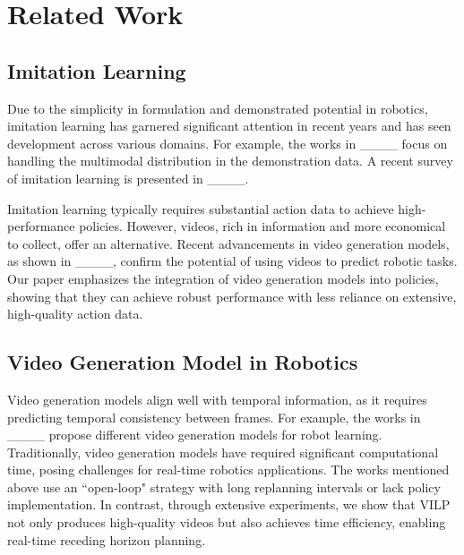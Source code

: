 \section{Related Work}
\label{sec:related_work}
\subsection{Imitation Learning}
Due to the simplicity in formulation and demonstrated potential in robotics, imitation learning has garnered significant attention in recent years and has seen development across various domains. For example, the works in ____ focus on handling the multimodal distribution in the demonstration data. A recent survey of imitation learning is presented in ____.


Imitation learning typically requires substantial action data to achieve high-performance policies. However, videos, rich in information and more economical to collect, offer an alternative. Recent advancements in video generation models, as shown in ____, confirm the potential of using videos to predict robotic tasks. Our paper emphasizes the integration of video generation models into policies, showing that they can achieve robust performance with less reliance on extensive, high-quality action data.

\subsection{Video Generation Model in Robotics}
Video generation models align well with temporal information, as it requires predicting temporal consistency between frames. For example, the works in ____ propose different video generation models for robot learning. Traditionally, video generation models have required significant computational time, posing challenges for real-time robotics applications. The works mentioned above use an  ``open-loop" strategy with long replanning intervals or lack policy implementation. In contrast, through extensive experiments, we show that VILP not only produces high-quality videos but also achieves time efficiency, enabling real-time receding horizon planning.